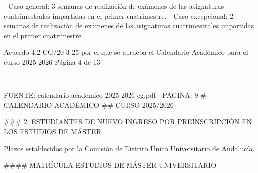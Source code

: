 \documentclass{article}
\begin{document}
\begin{itemize}
\begin{itemize}
\begin{scriptsize}
                  - Caso general: 3 semanas de realización de exámenes de las asignaturas cuatrimestrales impartidas en el primer cuatrimestre.
                  - Caso excepcional: 2 semanas de realización de exámenes de las asignaturas cuatrimestrales impartidas en el primer cuatrimestre.

                  Acuerdo 4.2 CG/20-3-25 por el que se aprueba el Calendario Académico para el curso 2025-2026  Página 4 de 13

                  ---

                  FUENTE: calendario-academico-2025-2026-cg.pdf | PÁGINA: 9
                  \# CALENDARIO ACADÉMICO
                  \#\# CURSO 2025/2026

                  \#\#\# 2. ESTUDIANTES DE NUEVO INGRESO POR PREINSCRIPCIÓN EN LOS ESTUDIOS DE MÁSTER

                  Plazos establecidos por la Comisión de Distrito Único Universitario de Andalucía.

                  \#\#\#\# MATRÍCULA ESTUDIOS DE MÁSTER UNIVERSITARIO


\end{scriptsize}
\end{itemize}
\end{itemize}
\end{document}
